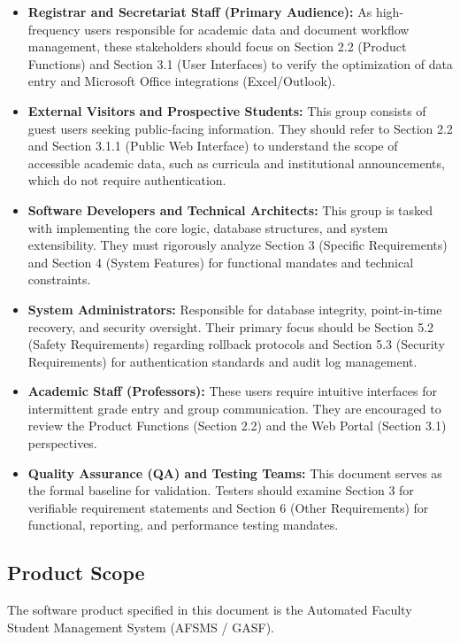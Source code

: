 \documentclass[11pt, a4paper]{article}
\begin{document}
\begin{itemize}
    \item \textbf{Registrar and Secretariat Staff (Primary Audience):} As high-frequency users responsible for academic data and document workflow management, these stakeholders should focus on Section 2.2 (Product Functions) and Section 3.1 (User Interfaces) to verify the optimization of data entry and Microsoft Office integrations (Excel/Outlook).
    \item \textbf{External Visitors and Prospective Students:} This group consists of guest users seeking public-facing information. They should refer to Section 2.2 and Section 3.1.1 (Public Web Interface) to understand the scope of accessible academic data, such as curricula and institutional announcements, which do not require authentication.
    \item \textbf{Software Developers and Technical Architects:} This group is tasked with implementing the core logic, database structures, and system extensibility. They must rigorously analyze Section 3 (Specific Requirements) and Section 4 (System Features) for functional mandates and technical constraints.
    \item \textbf{System Administrators:} Responsible for database integrity, point-in-time recovery, and security oversight. Their primary focus should be Section 5.2 (Safety Requirements) regarding rollback protocols and Section 5.3 (Security Requirements) for authentication standards and audit log management.
    \item \textbf{Academic Staff (Professors):} These users require intuitive interfaces for intermittent grade entry and group communication. They are encouraged to review the Product Functions (Section 2.2) and the Web Portal (Section 3.1) perspectives.
    \item \textbf{Quality Assurance (QA) and Testing Teams:} This document serves as the formal baseline for validation. Testers should examine Section 3 for verifiable requirement statements and Section 6 (Other Requirements) for functional, reporting, and performance testing mandates.
\end{itemize}

\subsection{Product Scope}
The software product specified in this document is the Automated Faculty Student Management System (AFSMS / GASF).
\end{document}
